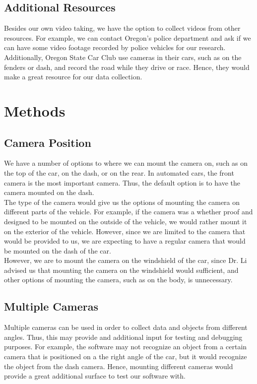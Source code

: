 \documentclass[10pt,draftclsnofoot,onecolumn,journal,compsoc]{IEEEtran}
\begin{document}
\subsection{Additional Resources}
Besides our own video taking, we have the option to collect videos from other resources. For example, we can contact Oregon’s police department and ask if we can have some video footage recorded by police vehicles for our research. Additionally, Oregon State Car Club use cameras in their cars, such as on the fenders or dash, and record the road while they drive or race. Hence, they would make a great resource for our data collection.


\section{Methods}
\subsection{Camera Position}
We have a number of options to where we can mount the camera on, such as on the top of the car, on the dash, or on the rear. In automated cars, the front camera is the most important camera. Thus, the default option is to have the camera mounted on the dash.\\

The type of the camera would give us the options of mounting the camera on different parts of the vehicle. For example, if the camera was a whether proof and designed to be mounted on the outside of the vehicle, we would rather mount it on the exterior of the vehicle. However, since we are limited to the camera that would be provided to us, we are expecting to have a regular camera that would be mounted on the dash of the car.\\

However, we are to mount the camera on the windshield of the car, since Dr. Li advised us that mounting the camera on the windshield would sufficient, and other options of mounting the camera, such as on the body, is unnecessary. 



\subsection{Multiple Cameras}
Multiple cameras can be used in order to collect data and objects from different angles. Thus, this may provide and additional input for testing and debugging purposes. For example, the software may not recognize an object from a certain camera that is positioned on a the right angle of the car, but it would recognize the object from the dash camera. Hence, mounting different cameras would provide a great additional surface to test our software with.\\
\end{document}
